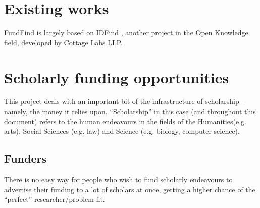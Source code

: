 \section{Existing works}


FundFind is largely based on IDFind \cite{idfind}, another project in the Open Knowledge field, developed by Cottage Labs LLP.



\section{Scholarly funding opportunities}
This project deals with an important bit of the infrastructure of scholarship - namely, the money it relies upon. ``Scholarship'' in this case (and throughout this document) refers to the human endeavours in the fields of the Humanities(e.g. arts), Social Sciences (e.g. law) and Science (e.g. biology, computer science).



\subsection{Funders}
There is no easy way for people who wish to fund scholarly endeavours to advertise their funding to a lot of scholars at once, getting a higher chance of the ``perfect'' researcher/problem fit.

